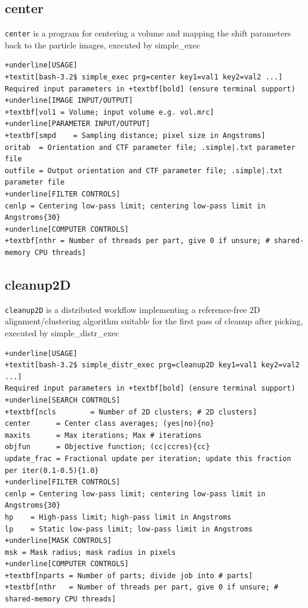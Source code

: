 \documentclass[a4paper,11pt]{article}
\newcommand{\prgname}[1]{\textcolor{NavyBlue}{\texttt{#1}}}
\begin{document}
\subsection{center}
\label{center}
\prgname{center} is a program for centering a volume and mapping the shift parameters back to the particle images, executed by simple\_exec
\begin{Verbatim}[commandchars=+\[\],fontsize=\small,breaklines=true]
+underline[USAGE]
+textit[bash-3.2$ simple_exec prg=center key1=val1 key2=val2 ...]
Required input parameters in +textbf[bold] (ensure terminal support)
+underline[IMAGE INPUT/OUTPUT]
+textbf[vol1 = Volume; input volume e.g. vol.mrc]
+underline[PARAMETER INPUT/OUTPUT]
+textbf[smpd    = Sampling distance; pixel size in Angstroms]
oritab  = Orientation and CTF parameter file; .simple|.txt parameter file
outfile = Output orientation and CTF parameter file; .simple|.txt parameter file
+underline[FILTER CONTROLS]
cenlp = Centering low-pass limit; centering low-pass limit in Angstroms{30}
+underline[COMPUTER CONTROLS]
+textbf[nthr = Number of threads per part, give 0 if unsure; # shared-memory CPU threads]
\end{Verbatim}

\subsection{cleanup2D}
\label{cleanup2D}
\prgname{cleanup2D} is a distributed workflow implementing a reference-free 2D alignment/clustering algorithm suitable for the first pass of cleanup after picking, executed by simple\_distr\_exec
\begin{Verbatim}[commandchars=+\[\],fontsize=\small,breaklines=true]
+underline[USAGE]
+textit[bash-3.2$ simple_distr_exec prg=cleanup2D key1=val1 key2=val2 ...]
Required input parameters in +textbf[bold] (ensure terminal support)
+underline[SEARCH CONTROLS]
+textbf[ncls        = Number of 2D clusters; # 2D clusters]
center      = Center class averages; (yes|no){no}
maxits      = Max iterations; Max # iterations
objfun      = Objective function; (cc|ccres){cc}
update_frac = Fractional update per iteration; update this fraction per iter(0.1-0.5){1.0}
+underline[FILTER CONTROLS]
cenlp = Centering low-pass limit; centering low-pass limit in Angstroms{30}
hp    = High-pass limit; high-pass limit in Angstroms
lp    = Static low-pass limit; low-pass limit in Angstroms
+underline[MASK CONTROLS]
msk = Mask radius; mask radius in pixels
+underline[COMPUTER CONTROLS]
+textbf[nparts = Number of parts; divide job into # parts]
+textbf[nthr   = Number of threads per part, give 0 if unsure; # shared-memory CPU threads]
\end{Verbatim}
\end{document}
